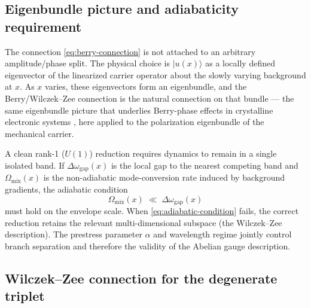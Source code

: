 \subsection{Eigenbundle picture and adiabaticity requirement}
\label{subsec:berry-eigenbundle}

The connection \eqref{eq:berry-connection} is not attached to an arbitrary amplitude/phase split.
The physical choice is $|u(x)\rangle$ as a locally defined eigenvector of the linearized carrier
operator about the slowly varying background at $x$.
As $x$ varies, these eigenvectors form an eigenbundle, and the Berry/Wilczek--Zee connection is the
natural connection on that bundle --- the same eigenbundle picture that underlies Berry-phase effects
in crystalline electronic systems \citep{XiaoChangNiu2010Berry}, here applied to the polarization
eigenbundle of the mechanical carrier.

A clean rank-1 ($U(1)$) reduction requires dynamics to remain in a single isolated band.
If $\Delta\omega_{\mathrm{gap}}(x)$ is the local gap to the nearest competing band and
$\Omega_{\mathrm{mix}}(x)$ is the non-adiabatic mode-conversion rate induced by background
gradients, the adiabatic condition
\begin{equation}
  \Omega_{\mathrm{mix}}(x) \;\ll\; \Delta\omega_{\mathrm{gap}}(x)
  \label{eq:adiabatic-condition}
\end{equation}
must hold on the envelope scale.
When \eqref{eq:adiabatic-condition} fails, the correct reduction retains the relevant
multi-dimensional subspace (the Wilczek--Zee description).
The prestress parameter $\alpha$ and wavelength regime jointly control branch separation and
therefore the validity of the Abelian gauge description.

\subsection{Wilczek--Zee connection for the degenerate triplet}
\label{subsec:wz-connection}

